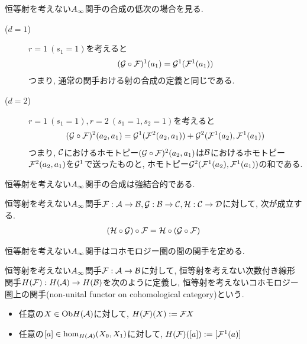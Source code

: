 \documentclass[uplatex, a4paper, 14Q, dvipdfmx]{jsarticle}
\begin{document}
\begin{remark}
  恒等射を考えない$A_{\infty}$関手の合成の低次の場合を見る. 
  \begin{description}
    \item[($d=1$)] $r=1 ~ (s_1=1)$を考えると
    \begin{align*}
      (\mathcal{G} \circ \mathcal{F})^1(a_1) 
      = \mathcal{G}^1(\mathcal{F}^1(a_1))
    \end{align*}
    つまり, 通常の関手おける射の合成の定義と同じである. 
    \item[($d=2$)] $r=1 ~ (s_1=1), r=2 ~ (s_1=1,s_2=1)$を考えると
    \begin{align*}
      (\mathcal{G} \circ \mathcal{F})^2(a_2,a_1) 
      = \mathcal{G}^1(\mathcal{F}^2(a_2,a_1)) + \mathcal{G}^2(\mathcal{F}^1(a_2),\mathcal{F}^1(a_1))
    \end{align*}
    つまり, $\mathcal{C}$におけるホモトピー$(\mathcal{G} \circ \mathcal{F})^2(a_2,a_1)$は$\mathcal{B}$におけるホモトピー$\mathcal{F}^2(a_2,a_1)$を$\mathcal{G}^1$で送ったものと, ホモトピー$\mathcal{G}^2(\mathcal{F}^1(a_2),\mathcal{F}^1(a_1))$の和である. 
  \end{description}
\end{remark}

恒等射を考えない$A_{\infty}$関手の合成は強結合的である. 

\begin{lemma} \label{prop_Ainf_functor_is_strictly_associative}
  恒等射を考えない$A_{\infty}$関手$\mathcal{F} : \mathcal{A} \to \mathcal{B}, \mathcal{G} : \mathcal{B} \to \mathcal{C}, \mathcal{H} : \mathcal{C} \to \mathcal{D}$に対して, 次が成立する. 
  \begin{align*}
    (\mathcal{H} \circ \mathcal{G}) \circ \mathcal{F} = \mathcal{H} \circ (\mathcal{G} \circ \mathcal{F})
  \end{align*}
\end{lemma}

恒等射を考えない$A_{\infty}$関手はコホモロジー圏の間の関手を定める. 

\begin{definition}[恒等射を考えないコホモロジー圏上の関手] \label{prop_F_induces_HF}
  恒等射を考えない$A_{\infty}$関手$\mathcal{F} : \mathcal{A} \to \mathcal{B}$に対して, 恒等射を考えない次数付き線形関手$H(\mathcal{F}) : H(\mathcal{A}) \to H(\mathcal{B})$を次のように定義し, 恒等射を考えないコホモロジー圏上の関手(non-unital functor on cohomological category)という.
  \begin{itemize}
    \item 任意の$X \in \mathrm{Ob} H(\mathcal{A})$に対して, $H(\mathcal{F})(X) := \mathcal{F} X$
    \item 任意の$[a] \in \hom_{H(\mathcal{A})}(X_0,X_1)$に対して, $H(\mathcal{F})([a]) := [\mathcal{F}^1(a)]$
  \end{itemize}
\end{definition}
\end{document}
